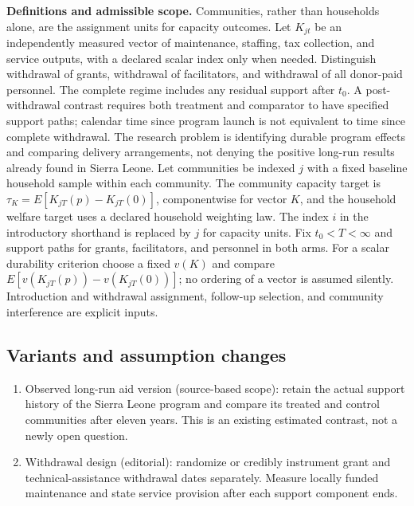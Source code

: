 \documentclass[11pt,a4paper]{article}
\begin{document}
\textbf{Definitions and admissible scope.} Communities, rather than households alone, are the assignment units for capacity outcomes. Let \(K_{jt}\) be an independently measured vector of maintenance, staffing, tax collection, and service outputs, with a declared scalar index only when needed. Distinguish withdrawal of grants, withdrawal of facilitators, and withdrawal of all donor-paid personnel. The complete regime includes any residual support after \(t_0\). A post-withdrawal contrast requires both treatment and comparator to have specified support paths; calendar time since program launch is not equivalent to time since complete withdrawal. The research problem is identifying durable program effects and comparing delivery arrangements, not denying the positive long-run results already found in Sierra Leone. Let communities be indexed \(j\) with a fixed baseline household sample within each community. The community capacity target is \(\tau_K=E[K_{jT}(p)-K_{jT}(0)]\), componentwise for vector \(K\), and the household welfare target uses a declared household weighting law. The index \(i\) in the introductory shorthand is replaced by \(j\) for capacity units. Fix \(t_0<T<\infty\) and support paths for grants, facilitators, and personnel in both arms. For a scalar durability criterion choose a fixed \(v(K)\) and compare \(E[v(K_{jT}(p))-v(K_{jT}(0))]\); no ordering of a vector is assumed silently. Introduction and withdrawal assignment, follow-up selection, and community interference are explicit inputs.
\subsection*{Variants and assumption changes}
\begin{enumerate}
\item Observed long-run aid version (source-based scope): retain the actual support history of the Sierra Leone program and compare its treated and control communities after eleven years. This is an existing estimated contrast, not a newly open question.
\item Withdrawal design (editorial): randomize or credibly instrument grant and technical-assistance withdrawal dates separately. Measure locally funded maintenance and state service provision after each support component ends.
\end{enumerate}
\end{document}
